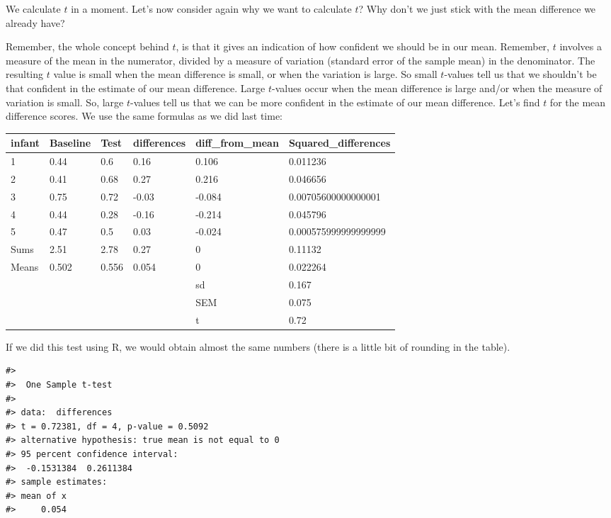 \documentclass[
  letterpaper,
  DIV=11,
  numbers=noendperiod]{scrreprt}
\begin{document}
We calculate \(t\) in a moment. Let's now consider again why we want to
calculate \(t\)? Why don't we just stick with the mean difference we
already have?

Remember, the whole concept behind \(t\), is that it gives an indication
of how confident we should be in our mean. Remember, \(t\) involves a
measure of the mean in the numerator, divided by a measure of variation
(standard error of the sample mean) in the denominator. The resulting
\(t\) value is small when the mean difference is small, or when the
variation is large. So small \(t\)-values tell us that we shouldn't be
that confident in the estimate of our mean difference. Large
\(t\)-values occur when the mean difference is large and/or when the
measure of variation is small. So, large \(t\)-values tell us that we
can be more confident in the estimate of our mean difference. Let's find
\(t\) for the mean difference scores. We use the same formulas as we did
last time:

\begin{tabular}{l|l|l|l|l|l}
\hline
infant & Baseline & Test & differences & diff\_from\_mean & Squared\_differences\\
\hline
1 & 0.44 & 0.6 & 0.16 & 0.106 & 0.011236\\
\hline
2 & 0.41 & 0.68 & 0.27 & 0.216 & 0.046656\\
\hline
3 & 0.75 & 0.72 & -0.03 & -0.084 & 0.00705600000000001\\
\hline
4 & 0.44 & 0.28 & -0.16 & -0.214 & 0.045796\\
\hline
5 & 0.47 & 0.5 & 0.03 & -0.024 & 0.000575999999999999\\
\hline
Sums & 2.51 & 2.78 & 0.27 & 0 & 0.11132\\
\hline
Means & 0.502 & 0.556 & 0.054 & 0 & 0.022264\\
\hline
 &  &  &  & sd & 0.167\\
\hline
 &  &  &  & SEM & 0.075\\
\hline
 &  &  &  & t & 0.72\\
\hline
\end{tabular}

If we did this test using R, we would obtain almost the same numbers
(there is a little bit of rounding in the table).

\begin{verbatim}
#> 
#>  One Sample t-test
#> 
#> data:  differences
#> t = 0.72381, df = 4, p-value = 0.5092
#> alternative hypothesis: true mean is not equal to 0
#> 95 percent confidence interval:
#>  -0.1531384  0.2611384
#> sample estimates:
#> mean of x 
#>     0.054
\end{verbatim}
\end{document}
